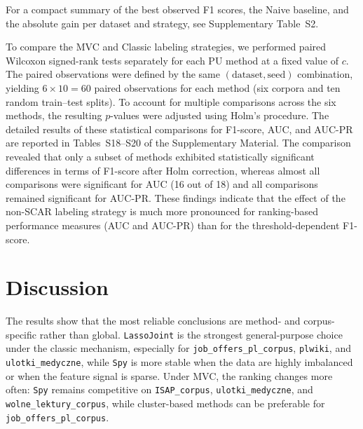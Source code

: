 \documentclass[applsci,article,accept,pdftex,moreauthors]{Definitions/mdpi}
\newcommand{\rev}[1]{{#1}}
\begin{document}
For a compact summary of the best observed F1 scores, the Naive baseline, and the absolute gain per dataset and strategy, see Supplementary Table~S2.

\rev{To compare the MVC and Classic labeling strategies, we performed paired Wilcoxon signed-rank tests separately for each PU method at a fixed value of $c$. The paired observations were defined by the same $(\text{dataset}, \text{seed})$ combination, yielding $6 \times 10 = 60$ paired observations for each method (six corpora and ten random train--test splits). To account for multiple comparisons across the six methods, the resulting $p$-values were adjusted using Holm's procedure. The detailed results of these statistical comparisons for F1-score, AUC, and AUC-PR are reported in Tables~S18--S20 of the Supplementary Material. The comparison revealed that only a subset of methods exhibited statistically significant differences in terms of F1-score after Holm correction, whereas almost all comparisons were significant for AUC (16 out of 18) and all comparisons remained significant for AUC-PR. These findings indicate that the effect of the non-SCAR labeling strategy is much more pronounced for ranking-based performance measures (AUC and AUC-PR) than for the threshold-dependent F1-score.}

\section{Discussion}

\rev{The results show that the most reliable conclusions are method- and corpus-specific rather than global. \texttt{LassoJoint} is the strongest general-purpose choice under the classic mechanism, especially for \texttt{job\_offers\_pl\_corpus}, \texttt{plwiki}, and \texttt{ulotki\_medyczne}, while \texttt{Spy} is more stable when the data are highly imbalanced or when the feature signal is sparse. Under MVC, the ranking changes more often: \texttt{Spy} remains competitive on \texttt{ISAP\_corpus}, \texttt{ulotki\_medyczne}, and \texttt{wolne\_lektury\_corpus}, while cluster-based methods can be preferable for \texttt{job\_offers\_pl\_corpus}.}
\end{document}
